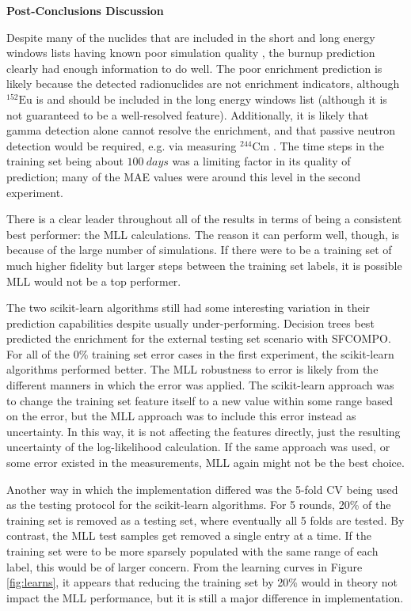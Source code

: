\noindent \textbf{Post-Conclusions Discussion}

Despite many of the nuclides that are included in the short and long energy
windows lists having known poor simulation quality \cite{pwr_benchmark_2010,
skutnik_2021}, the burnup prediction clearly had enough information to do well.
The poor enrichment prediction is likely because the detected radionuclides are
not enrichment indicators, although ${}^{152}\text{Eu}$ is and should be
included in the long energy windows list (although it is not guaranteed to be a
well-resolved feature).  Additionally, it is likely that gamma detection alone
cannot resolve the enrichment, and that passive neutron detection would be
required, e.g. via measuring ${}^{244}\text{Cm}$ \cite{skutnik_2016}.  The time
steps in the training set being about $100\:days$ was a limiting factor in its
quality of prediction; many of the \gls{MAE} values were around this level in
the second experiment. 

There is a clear leader throughout all of the results in terms of being a
consistent best performer: the \gls{MLL} calculations. The reason it can
perform well, though, is because of the large number of simulations.  If there
were to be a training set of much higher fidelity but larger steps between the
training set labels, it is possible \gls{MLL} would not be a top performer. 

The two scikit-learn algorithms still had some interesting variation in their
prediction capabilities despite usually under-performing. Decision trees best
predicted the enrichment for the external testing set scenario with
\gls{SFCOMPO}. For all of the 0\% training set error cases in the first
experiment, the scikit-learn algorithms performed better.  The \gls{MLL}
robustness to error is likely from the different manners in which the error was
applied.  The scikit-learn approach was to change the training set feature
itself to a new value within some range based on the error, but the \gls{MLL}
approach was to include this error instead as uncertainty. In this way, it is
not affecting the features directly, just the resulting uncertainty of the
log-likelihood calculation. If the same approach was used, or some error
existed in the measurements, \gls{MLL} again might not be the best choice. 

Another way in which the implementation differed was the 5-fold \gls{CV} being
used as the testing protocol for the scikit-learn algorithms. For 5 rounds,
20\% of the training set is removed as a testing set, where eventually all 5
folds are tested.  By contrast, the \gls{MLL} test samples get removed a single
entry at a time.  If the training set were to be more sparsely populated with
the same range of each label, this would be of larger concern.  From the
learning curves in Figure \ref{fig:learns}, it appears that reducing the
training set by 20\% would in theory not impact the \gls{MLL} performance, but
it is still a major difference in implementation. 

